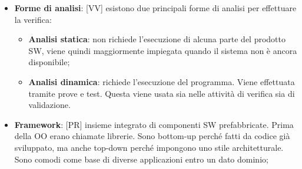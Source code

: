 \begin{itemize}
		\item \textbf{Forme di analisi}: [VV] esistono due principali forme di analisi per effettuare la verifica:
			\begin{itemize}
				\item \textbf{Analisi statica}: non richiede l'esecuzione di alcuna parte del prodotto SW, viene quindi maggiormente impiegata quando il sistema non è ancora disponibile;
				\item \textbf{Analisi dinamica}: richiede l'esecuzione del programma. Viene effettuata tramite prove e test. Questa viene usata sia nelle attività di verifica sia di validazione.
			\end{itemize}

		\item \textbf{Framework}: [PR] insieme integrato di componenti SW prefabbricate. Prima della OO erano chiamate librerie. Sono bottom-up perché fatti da codice già sviluppato, ma anche top-down perché impongono uno stile architetturale. Sono comodi come base di diverse applicazioni entro un dato dominio;

	\end{itemize}